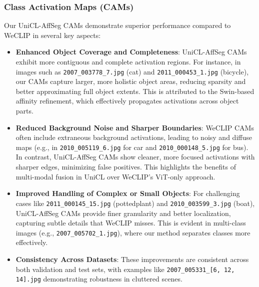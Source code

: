 \subsubsection{Class Activation Maps (CAMs)}
Our UniCL-AffSeg CAMs demonstrate superior performance compared to WeCLIP in several key aspects:
\begin{itemize}
    \item \textbf{Enhanced Object Coverage and Completeness}: UniCL-AffSeg CAMs exhibit more contiguous and complete activation regions. For instance, in images such as \texttt{2007\_003778\_7.jpg} (cat) and \texttt{2011\_000453\_1.jpg} (bicycle), our CAMs capture larger, more holistic object areas, reducing sparsity and better approximating full object extents. This is attributed to the Swin-based affinity refinement, which effectively propagates activations across object parts.
    \item \textbf{Reduced Background Noise and Sharper Boundaries}: WeCLIP CAMs often include extraneous background activations, leading to noisy and diffuse maps (e.g., in \texttt{2010\_005119\_6.jpg} for car and \texttt{2010\_000148\_5.jpg} for bus). In contrast, UniCL-AffSeg CAMs show cleaner, more focused activations with sharper edges, minimizing false positives. This highlights the benefits of multi-modal fusion in UniCL over WeCLIP's ViT-only approach.
    \item \textbf{Improved Handling of Complex or Small Objects}: For challenging cases like \texttt{2011\_000145\_15.jpg} (pottedplant) and \texttt{2010\_003599\_3.jpg} (boat), UniCL-AffSeg CAMs provide finer granularity and better localization, capturing subtle details that WeCLIP misses. This is evident in multi-class images (e.g., \texttt{2007\_005702\_1.jpg}), where our method separates classes more effectively.
    \item \textbf{Consistency Across Datasets}: These improvements are consistent across both validation and test sets, with examples like \texttt{2007\_005331\_[6, 12, 14].jpg} demonstrating robustness in cluttered scenes.
\end{itemize}

